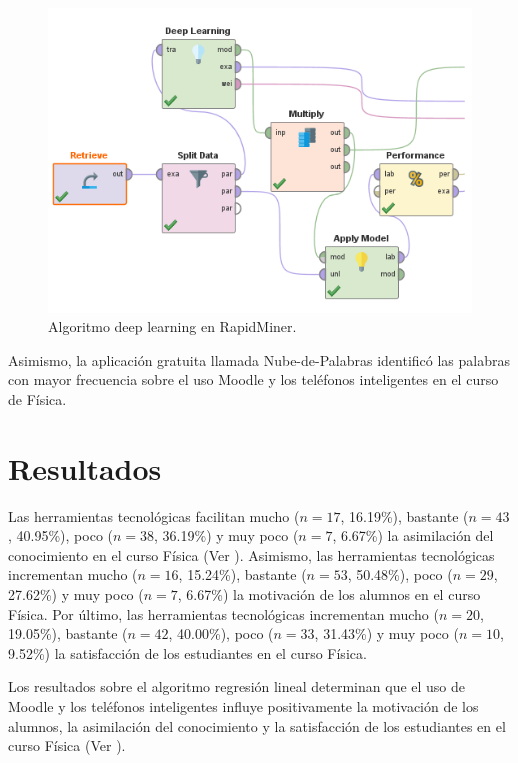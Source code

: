 \documentclass[spanish]{textolivre}
\begin{document}
\begin{figure}[htbp]
\centering
\begin{minipage}{.85\textwidth}
 \includegraphics[width=\textwidth]{Image4.png}
 \caption{Algoritmo deep learning en RapidMiner.}
 \label{fig04}
\end{minipage}
\end{figure}

Asimismo, la aplicación gratuita llamada Nube-de-Palabras identificó las palabras con mayor frecuencia sobre el uso Moodle y los teléfonos inteligentes en el curso de Física.

\section{Resultados}

Las herramientas tecnológicas facilitan mucho ($n = 17$, 16.19\%), bastante ($n = 43$, 40.95\%), poco ($n = 38$, 36.19\%) y muy poco ($n = 7$, 6.67\%) la asimilación del conocimiento en el curso Física (Ver ). Asimismo, las herramientas tecnológicas incrementan mucho ($n = 16$, 15.24\%), bastante ($n = 53$, 50.48\%), poco ($n = 29$, 27.62\%) y muy poco ($n = 7$, 6.67\%) la motivación de los alumnos en el curso Física. Por último, las herramientas tecnológicas incrementan mucho ($n = 20$, 19.05\%), bastante ($n = 42$, 40.00\%), poco ($n = 33$, 31.43\%) y muy poco ($n = 10$, 9.52\%) la satisfacción de los estudiantes en el curso Física.

Los resultados sobre el algoritmo regresión lineal determinan que el uso de Moodle y los teléfonos inteligentes influye positivamente la motivación de los alumnos, la asimilación del conocimiento y la satisfacción de los estudiantes en el curso Física (Ver ).
\end{document}
